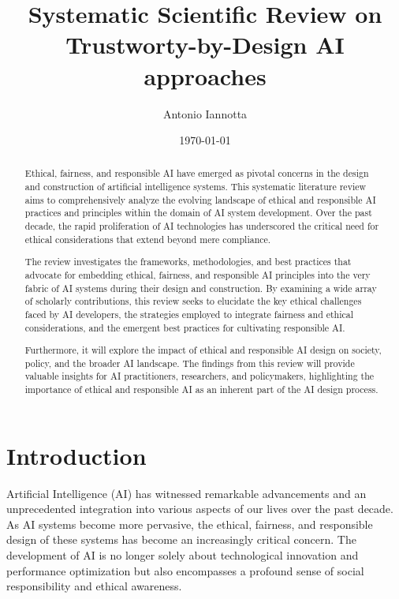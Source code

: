 \documentclass{article}
\title{Systematic Scientific Review on Trustworty-by-Design AI approaches}
\author{Antonio Iannotta}
\date{\today}
\begin{document}
\maketitle

\begin{abstract}

    Ethical, fairness, and responsible AI have emerged as pivotal concerns in the design and construction of artificial intelligence systems. This systematic literature review aims to comprehensively analyze the evolving landscape of ethical and responsible AI practices and principles within the domain of AI system development. Over the past decade, the rapid proliferation of AI technologies has underscored the critical need for ethical considerations that extend beyond mere compliance. 
    
    The review investigates the frameworks, methodologies, and best practices that advocate for embedding ethical, fairness, and responsible AI principles into the very fabric of AI systems during their design and construction. By examining a wide array of scholarly contributions, this review seeks to elucidate the key ethical challenges faced by AI developers, the strategies employed to integrate fairness and ethical considerations, and the emergent best practices for cultivating responsible AI. 
    
    Furthermore, it will explore the impact of ethical and responsible AI design on society, policy, and the broader AI landscape. The findings from this review will provide valuable insights for AI practitioners, researchers, and policymakers, highlighting the importance of ethical and responsible AI as an inherent part of the AI design process.

\end{abstract}

\newpage
\section{Introduction}

Artificial Intelligence (AI) has witnessed remarkable advancements and an unprecedented integration into various aspects of our lives over the past decade. As AI systems become more pervasive, the ethical, fairness, and responsible design of these systems has become an increasingly critical concern. The development of AI is no longer solely about technological innovation and performance optimization but also encompasses a profound sense of social responsibility and ethical awareness. 
\end{document}
